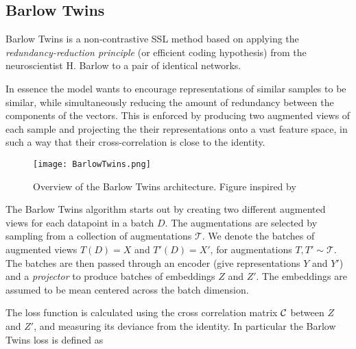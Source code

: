 \documentclass[../../thesis.tex]{subfiles}
\begin{document}





\subsection{Barlow Twins}
Barlow Twins is a non-contrastive SSL method based on applying the \textit{redundancy-reduction principle} (or efficient coding hypothesis) \cite{Barlow_origin} from the neuroscientist H. Barlow to a pair of identical networks.\newline  

In essence the model wants to encourage representations of similar samples to be similar, while simultaneously reducing the amount of redundancy between the components of the vectors. This is enforced by producing two augmented views of each sample and projecting the their representations onto a vast feature space, in such a way that their cross-correlation is close to the identity. \newline

\begin{figure}[h]
    \texttt{[image: BarlowTwins.png]}
    \centering    
    \caption{Overview of the Barlow Twins architecture. Figure inspired by \cite{zbontar2021barlow}}
\end{figure}

The Barlow Twins algorithm starts out by creating two different augmented views for each datapoint in a batch $D$. The augmentations are selected by sampling from a collection of augmentations $\mathcal{T}$. We denote the batches of augmented views $T(D) = X$ and $T'(D) =X'$, for augmentations $T,T'\sim \mathcal{T}$.  The batches are then passed through an encoder (give representations $Y$ and $Y'$) and a \textit{projector} to produce batches of embeddings $Z$ and $Z'$. The embeddings are assumed to be mean centered across the batch dimension. \newline

The loss function is calculated using the cross correlation matrix $\mathcal{C}$ between $Z$ and $Z'$, and measuring its deviance from the identity. In particular the Barlow Twins loss is defined as
\end{document}
